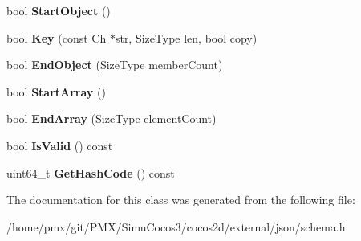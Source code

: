 \begin{DoxyCompactItemize}
\item 
\mbox{\label{classinternal_1_1Hasher_a1607d6cac3daab9725e442e38d121028}} 
bool {\bfseries Start\+Object} ()
\item 
\mbox{\label{classinternal_1_1Hasher_a1b34d88f85f9c6a739c1f9038f14f078}} 
bool {\bfseries Key} (const Ch $\ast$str, Size\+Type len, bool copy)
\item 
\mbox{\label{classinternal_1_1Hasher_a7050f1552d88967944195163a6a0b08e}} 
bool {\bfseries End\+Object} (Size\+Type member\+Count)
\item 
\mbox{\label{classinternal_1_1Hasher_a2ceb3cc00216f6b6ce66907856a16404}} 
bool {\bfseries Start\+Array} ()
\item 
\mbox{\label{classinternal_1_1Hasher_ad445b2730be23e18b4dec2c4d1033419}} 
bool {\bfseries End\+Array} (Size\+Type element\+Count)
\item 
\mbox{\label{classinternal_1_1Hasher_ae09fee05c56194031e8af94a1b1be145}} 
bool {\bfseries Is\+Valid} () const
\item 
\mbox{\label{classinternal_1_1Hasher_ac221aaaa0d643aae553125e76aed7b47}} 
uint64\+\_\+t {\bfseries Get\+Hash\+Code} () const
\end{DoxyCompactItemize}


The documentation for this class was generated from the following file\+:\begin{DoxyCompactItemize}
\item 
/home/pmx/git/\+P\+M\+X/\+Simu\+Cocos3/cocos2d/external/json/schema.\+h\end{DoxyCompactItemize}
